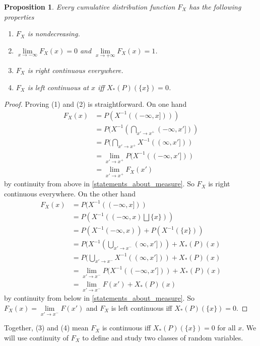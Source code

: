\documentclass[12pt]{amsart}
\newtheorem{proposition}[theorem]{Proposition}
\theoremstyle{definition}
\begin{document}
\begin{proposition} \label{distribution_function} Every cumulative distribution function $F_X$ has the following properties
\begin{enumerate}[1.]
\item $F_X$ is nondecreasing.
\item $\lim\limits_{x \rightarrow -\infty} F_X(x) = 0$ and $\lim\limits_{x \rightarrow +\infty} F_X(x) = 1$.
\item $F_X$ is right continuous everywhere.
\item $F_X$ is left continuous at $x$ iff $X_*(P)(\{x\}) = 0$.
\end{enumerate}
\end{proposition}
\begin{proof} Proving (1) and (2) is straightforward. On one hand
\begin{align*}
F_X(x) & = P(X^{-1}((-\infty, x]))) \\
 & = P(X^{-1}(\bigcap\limits_{x' \to x^+} (-\infty, x'])) \\
 & = P(\bigcap\limits_{x' \to x^+} X^{-1}((\infty, x'])) \\
 & = \lim\limits_{x' \to x^+} P(X^{-1}((-\infty, x'])) \\
 & = \lim\limits_{x' \to x^+} F_X(x')
\end{align*}
by continuity from above in \ref{statements_about_measure}. So $F_X$ is right continuous everywhere. On  the other hand
\begin{align*}
F_X(x) & = P(X^{-1}((-\infty, x])) \\
 & = P(X^{-1}((-\infty, x) \bigsqcup \{x\})) \\
 & = P(X^{-1}(-\infty, x)) + P(X^{-1}(\{x\})) \\
 & = P(X^{-1} (\bigcup\limits_{x' \to x^-}  (\infty, x'])) + X_*(P)(x) \\
 & = P(\bigcup\limits_{x' \to x^-} X^{-1}((\infty, x'])) + X_*(P)(x) \\
 & = \lim\limits_{x' \to x^-} P(X^{-1}((-\infty, x'])) + X_*(P)(x) \\
 & = \lim\limits_{x' \to x^-} F(x') + X_*(P)(x)
\end{align*}
by continuity from below in \ref{statements_about_measure}. So $F_X(x) = \lim\limits_{x' \to x^-} F(x')$ and $F_X$ is left continuous iff $X_*(P)(\{x\}) = 0$.
\end{proof}

Together, (3) and (4) mean $F_X$ is continuous iff $X_*(P)(\{x\}) = 0$ for all $x$. We will use continuity of $F_X$ to define and study two classes of random variables.
\end{document}
